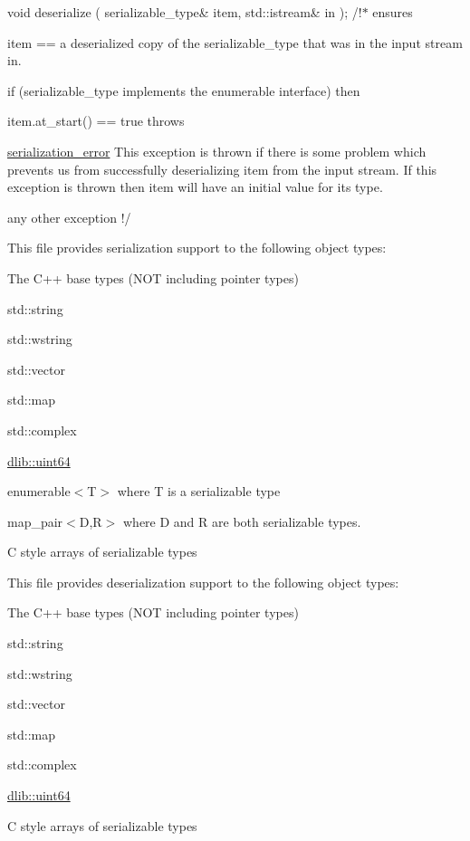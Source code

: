 void deserialize ( serializable\_\-type\& item, std::istream\& in ); /!$\ast$ ensures
\begin{DoxyItemize}
\item item == a deserialized copy of the serializable\_\-type that was in the input stream in.
\item if (serializable\_\-type implements the enumerable interface) then
\begin{DoxyItemize}
\item item.at\_\-start() == true throws
\end{DoxyItemize}
\item \hyperlink{classdlib_1_1serialization__error}{serialization\_\-error} This exception is thrown if there is some problem which prevents us from successfully deserializing item from the input stream. If this exception is thrown then item will have an initial value for its type.
\item any other exception !/
\end{DoxyItemize}

This file provides serialization support to the following object types:
\begin{DoxyItemize}
\item The C++ base types (NOT including pointer types)
\item std::string
\item std::wstring
\item std::vector
\item std::map
\item std::complex
\item \hyperlink{namespacedlib_a61113f8b6b3e4ccb66deca9355c8f65d}{dlib::uint64}
\item enumerable$<$T$>$ where T is a serializable type
\item map\_\-pair$<$D,R$>$ where D and R are both serializable types.
\item C style arrays of serializable types
\end{DoxyItemize}

This file provides deserialization support to the following object types:
\begin{DoxyItemize}
\item The C++ base types (NOT including pointer types)
\item std::string
\item std::wstring
\item std::vector
\item std::map
\item std::complex
\item \hyperlink{namespacedlib_a61113f8b6b3e4ccb66deca9355c8f65d}{dlib::uint64}
\item C style arrays of serializable types
\end{DoxyItemize}

